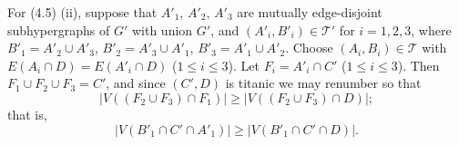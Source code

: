 For (4.5) (ii), suppose that $A'_1$, $A'_2$, $A'_3$ are mutually edge-disjoint subhypergraphs of $G'$ with union $G'$, and $(A'_i, B'_i) \in \mathscr{T}'$ for $i = 1, 2, 3$, where $B'_1 = A'_2 \cup A'_3$, $B'_2 = A'_3 \cup A'_1$, $B'_3 = A'_1 \cup A'_2$. Choose $(A_i, B_i) \in \mathscr{T}$ with $E(A_i \cap D) = E(A'_i \cap D)$ ($1 \le i \le 3$). Let $F_i = A'_i \cap C'$ ($1 \le i \le 3$). Then $F_1 \cup F_2 \cup F_3 = C'$, and since $(C', D)$ is titanic we may renumber so that
\begin{equation*}
|V((F_2 \cup F_3) \cap F_1)| \ge |V((F_2 \cup F_3) \cap D)|;
\end{equation*}
that is,
\begin{equation*}
|V(B'_1 \cap C' \cap A'_1)| \ge |V(B'_1 \cap C' \cap D)|.
\end{equation*}
